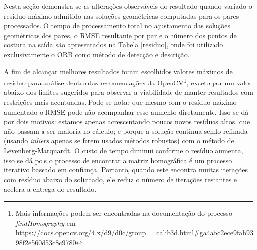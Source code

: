Nesta seção demonstra-se as alterações observáveis do resultado quando variado o resíduo máximo admitido nas soluções geométricas computadas para os pares processados. O tempo de processamento total no ajustamento das soluções geométricas dos pares, o RMSE resultante por par e o número dos pontos de costura na saída são apresentados na Tabela \ref{residuo}, onde foi utilizado exclusivamente o ORB como método de detecção e descrição.

A fim de alcançar melhores resultados foram escolhidos valores máximos de resíduo para análise dentro das recomendações da OpenCV\footnote{Mais informações podem ser encontradas na documentação do processo \textit{findHomography} em \url{https://docs.opencv.org/4.x/d9/d0c/group\_\_calib3d.html\#ga4abc2ece9fab9398f2e560d53c8c9780}}, exceto por um valor abaixo dos limites sugeridos para observar a viabilidade de manter resultados com restrições mais acentuadas.
Pode-se notar que mesmo com o resíduo máximo aumentado o RMSE pode não acompanhar esse aumento diretamente. Isso se dá por dois motivos: estamos apenas acrescentando poucos novos resíduos altos, que não passam a ser maioria no cálculo; e porque a solução continua sendo refinada (usando \textit{inliers} apenas se forem usados métodos robustos) com o método de Levenberg-Marquardt.
O custo de tempo diminui conforme o resíduo aumenta, isso se dá pois o processo de encontrar a matriz homográfica é um processo iterativo baseado em confiança. Portanto, quando este encontra muitas iterações com resíduo abaixo do solicitado, ele reduz o número de iterações restantes e acelera a entrega do resultado.

